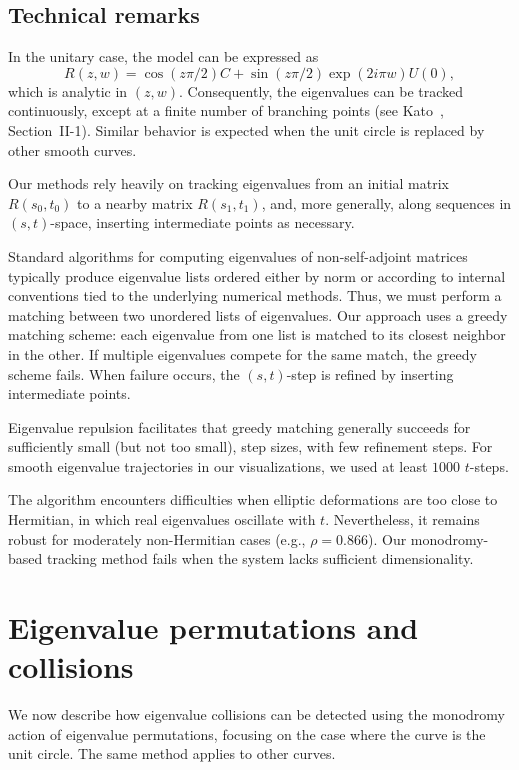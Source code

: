 \documentclass{article}
\begin{document}
	
	\subsection{Technical remarks} \label{subsection:techincal-remarks}

	In the unitary case, the model can be expressed as	
	$$R(z,w) = \cos(z \pi / 2)C + \sin(z \pi / 2)\exp(2i \pi w)U(0),$$
	which is analytic in $(z,w)$. 
	Consequently, the eigenvalues can be tracked continuously, 
	except at a finite number of branching points 
	(see Kato~\cite{Kato-1995}, Section~II-1). 
	Similar behavior is expected when the unit circle is replaced by other smooth curves.

	Our methods rely heavily on tracking eigenvalues from an initial matrix $R(s_0,t_0)$ 
	to a nearby matrix $R(s_1,t_1)$, and, more generally, 
	along sequences in $(s,t)$-space, inserting intermediate points as necessary.
	
	Standard algorithms for computing eigenvalues of non-self-adjoint matrices 
	typically produce eigenvalue lists ordered either by norm 
	or according to internal conventions tied to the underlying numerical methods. 
	Thus, we must perform a matching between two unordered lists of eigenvalues. 
	Our approach uses a greedy matching scheme: 
	each eigenvalue from one list is matched to its closest neighbor in the other. 
	If multiple eigenvalues compete for the same match, the greedy scheme fails. 
	When failure occurs, the $(s,t)$-step is refined by inserting intermediate points.

	Eigenvalue repulsion facilitates that greedy matching generally succeeds 
	for sufficiently small (but not too small), step sizes, 
	with few refinement steps. 
	For smooth eigenvalue trajectories in our visualizations, 
	we used at least $1000$ $t$-steps.
	
	The algorithm encounters difficulties when elliptic deformations 
	are too close to Hermitian, 
	in which real eigenvalues oscillate with $t$. 
	Nevertheless, it remains robust for moderately non-Hermitian cases (e.g., $\rho = 0.866$). 
	Our monodromy-based tracking method 
	fails when the system lacks sufficient dimensionality.

	\section{Eigenvalue permutations and collisions} \label{section:eigenvalue-permutations-and-collisions}	

	We now describe how eigenvalue collisions can be detected 
	using the monodromy action of eigenvalue permutations, 
	focusing on the case where the curve is the unit circle. 
	The same method applies to other curves.
\end{document}

